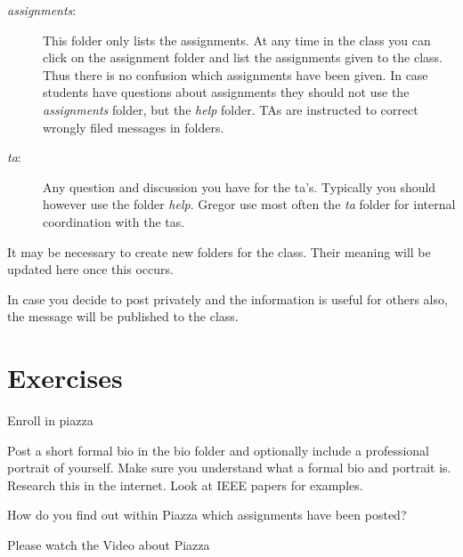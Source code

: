 \begin{description}
\item[\emph{assignments}:]
This folder only lists the assignments. At any time in the class you can
click on the assignment folder and list the assignments given to the
class. Thus there is no confusion which assignments have been given. In
case students have questions about assignments they should not use the
\emph{assignments} folder, but the \emph{help} folder. TAs are
instructed to correct wrongly filed messages in folders.
\item[\emph{ta}:]
Any question and discussion you have for the ta's. Typically you should
however use the folder \emph{help}. Gregor use most often the \emph{ta}
folder for internal coordination with the tas.
\end{description}

It may be necessary to create new folders for the class. Their meaning
will be updated here once this occurs.

In case you decide to post privately and the information is useful for
others also, the message will be published to the class.

\section{Exercises}


\begin{exercise}\label{E:Piazza.1}
 Enroll in piazza
\end{exercise}

\begin{exercise}\label{E:Piazza.2}
  Post a short formal bio in the bio folder and optionally
  include a professional portrait of yourself. Make sure you
  understand what a formal bio  and portrait is. Research this in the
  internet. Look at IEEE papers for examples.
\end{exercise}

\begin{exercise}\label{E:Piazza.3}
  How do you find out within Piazza which assignments have
  been posted?
\end{exercise}

\begin{exercise}\label{E:Piazza.4}
  Please watch the Video about Piazza
\end{exercise}




